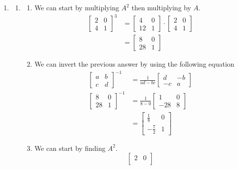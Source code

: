 \documentclass[11pt, letterpaper, twoside]{article}
\begin{document}
\begin{enumerate}
\item \begin{enumerate}[label=(\alph*)] %
\item\begin{enumerate}[label=\roman*.]\item We can start by multiplying $A^2$ then multiplying by $A$.\begin{align*} \begin{bmatrix}
2 & 0\\
4 & 1
\end{bmatrix}^3&=\begin{bmatrix}
4 & 0\\
12 & 1
\end{bmatrix}\cdot \begin{bmatrix}
2 & 0\\
4 & 1
\end{bmatrix}\\
&=	\begin{bmatrix}
8 & 0\\
28 & 1
\end{bmatrix}
\end{align*}
\item We can invert the previous answer by using the following equation
\begin{align*} \begin{bmatrix}
a & b\\
c & d
\end{bmatrix}^{-1}&=\frac{1}{ad-bc}\begin{bmatrix}
d & -b\\
-c & a
\end{bmatrix}\\
\begin{bmatrix}
8 & 0\\
28 & 1
\end{bmatrix}^{-1}&=\frac{1}{8-0}\begin{bmatrix}
1 & 0\\
-28 & 8
\end{bmatrix}\\
&=\begin{bmatrix}
\frac{1}{8} & 0\\
-\frac{7}{2} & 1
\end{bmatrix}
\end{align*}
\item We can start by finding $A^2$.
$$ \begin{bmatrix}
2 & 0\\

\end{bmatrix}$$
\end{enumerate}
\end{enumerate}
\end{enumerate}
\end{document}
